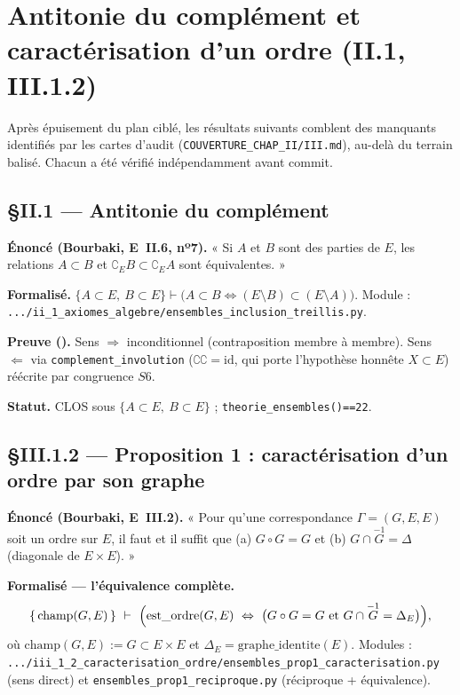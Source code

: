 \section{Antitonie du complément et caractérisation d'un ordre (II.1, III.1.2)}

Après épuisement du plan ciblé, les résultats suivants comblent des manquants
identifiés par les cartes d'audit (\texttt{COUVERTURE\_CHAP\_II/III.md}), au-delà du
terrain balisé. Chacun a été vérifié indépendamment avant commit.

\subsection{§II.1 --- Antitonie du complément}
\textbf{Énoncé (Bourbaki, E~II.6, nº7).} « Si $A$ et $B$ sont des parties de $E$, les
relations $A\subset B$ et $\complement_E B\subset\complement_E A$ sont équivalentes. »

\textbf{Formalisé.} $\{A\subset E,\ B\subset E\}\vdash\bigl(A\subset B \Leftrightarrow
(E\setminus B)\subset(E\setminus A)\bigr)$. Module :
\texttt{.../ii\_1\_axiomes\_algebre/ensembles\_inclusion\_treillis.py}.

\textbf{Preuve (\Nstar).} Sens $\Rightarrow$ inconditionnel (contraposition membre à
membre). Sens $\Leftarrow$ via \texttt{complement\_involution} ($\complement\complement=\mathrm{id}$,
qui porte l'hypothèse honnête $X\subset E$) réécrite par congruence $S6$.

\textbf{Statut.} CLOS sous $\{A\subset E,\ B\subset E\}$ ; \texttt{theorie\_ensembles()==22}.

\subsection{§III.1.2 --- Proposition 1 : caractérisation d'un ordre par son graphe}
\textbf{Énoncé (Bourbaki, E~III.2).} « Pour qu'une correspondance $\Gamma=(G,E,E)$ soit
un ordre sur $E$, il faut et il suffit que (a) $G\circ G=G$ et (b) $G\cap\overset{-1}{G}=\Delta$
(diagonale de $E\times E$). »

\textbf{Formalisé --- l'équivalence complète.}
\[
  \{\,\mathrm{champ}(G,E)\,\}\ \vdash\ \Bigl(\mathrm{est\_ordre}(G,E)\ \Leftrightarrow\
  \bigl(G\circ G=G\ \text{et}\ G\cap\overset{-1}{G}=\Delta_E\bigr)\Bigr),
\]
où $\mathrm{champ}(G,E):=G\subset E\times E$ et $\Delta_E=\mathrm{graphe\_identite}(E)$.
Modules : \texttt{.../iii\_1\_2\_caracterisation\_ordre/ensembles\_prop1\_caracterisation.py}
(sens direct) et \texttt{ensembles\_prop1\_reciproque.py} (réciproque + équivalence).

